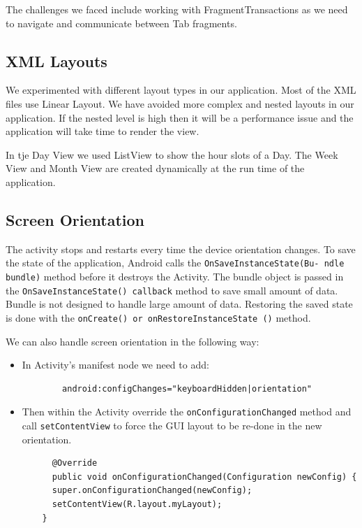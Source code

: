 \documentclass[10pt,a4paper]{report}
\begin{document}
The challenges we faced include working with FragmentTransactions as we need to navigate and communicate between Tab fragments. 

\subsection{XML Layouts}

We experimented with different layout types in our application. Most of the XML files use Linear Layout. We have avoided more complex and nested layouts in our application. If the nested level is high then it will be a performance issue and the application will take time to render the view.

In tje Day View we used ListView to show the hour slots of a Day. The Week View and Month View are created dynamically at the run time of the application.

\subsection{Screen Orientation}

The activity stops and restarts every time the device orientation changes. To save the state of the application, Android calls the \texttt{OnSaveInstanceState(Bu- ndle bundle)} method before it destroys the Activity. The bundle object is passed in the \texttt{OnSaveInstanceState() callback} method to save small amount of data. Bundle is not designed to handle large amount of data. Restoring the saved state is done with the \texttt{onCreate() or onRestoreInstanceState ()} method.

We can also handle screen orientation in the following way:
\begin{itemize}
 \item In  Activity's manifest node we need to add: 
  \begin{verbatim}
 		android:configChanges="keyboardHidden|orientation"
   \end{verbatim}
   
  \item  Then within the Activity override the \texttt{onConfigurationChanged} method and call \texttt{setContentView} to force the GUI layout to be re-done in the new orientation.
  \begin{verbatim}
	  @Override
 	  public void onConfigurationChanged(Configuration newConfig) {
	  super.onConfigurationChanged(newConfig);
  	  setContentView(R.layout.myLayout);
	}
 \end{verbatim}
\end{itemize}
\end{document}
